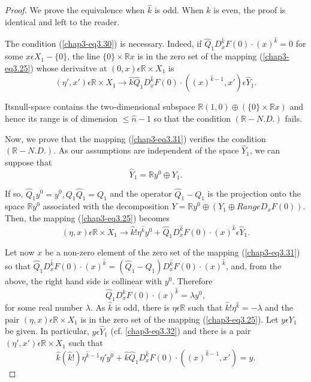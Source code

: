 \begin{proof}
We prove the equivalence when $\hat{k}$ is odd. When $\hat{k}$ is
even, the proof is identical and left to the reader.

The condition (\ref{chap3-eq3.30}) is necessary. Indeed, if
$\hat{Q}_{1}D_{x}^{\hat{k}}F(0) \cdot (x)^{\hat{k}} = 0$ for some $x
\epsilon X_{1} - \{0\}$, the line $\{0\} \times \mathbb{R}x$ is in the
zero set of the mapping (\ref{chap3-eq3.25}) whose derivaitve at $(0,
x) \epsilon \mathbb{R} \times X_{1}$ is
$$
(\eta' , x') \epsilon \mathbb{R} \times X_{1} \to
\hat{k}\hat{Q}_{1}D_{x}^{\hat{k}}F(0) \cdot ((x)^{\hat{k}-1}, x')
\epsilon \hat{Y}_{1}.
$$

Its\pageoriginale null-space contains the two-dimensional subspace
$\mathbb{R} (1, 0) \oplus (\{0\} \times \mathbb{R}x)$ and hence its
range is of dimension $\leq \hat{n} - 1$ so that the condition
$(\mathbb{R}-N.D.)$ fails.

Now, we prove that the mapping (\ref{chap3-eq3.31}) verifies the
condition $(\mathbb{R}-N.D.)$. As our assumptions are independent of
the space $\hat{Y}_{1}$, we can suppose that
\begin{equation*}
\hat{Y}_{1} = \mathbb{R} y^{0} \oplus Y_{1}.\tag{3.32}\label{chap3-eq3.32}
\end{equation*}

If so, $\hat{Q}_{1} y^{0} = y^{0}, Q_{1}\hat{Q}_{1} = Q_{1}$ and the
operator $\hat{Q}_{1} - Q_{1}$ is the projection onto the space
$\mathbb{R} y^{0}$ associated with the decomposition $Y = \mathbb{R}
y^{0} \oplus (Y_{1} \oplus Range D_{x}F(0))$. Then, the mapping
(\ref{chap3-eq3.25}) becomes 
$$
(\eta, x) \epsilon \mathbb{R} \times X_{1} \to \hat{k}! \eta^{\hat{k}}
y^{0} + \hat{Q}_{1}D_{x}^{\hat{k}}F(0) \cdot (x)^{\hat{k}} \epsilon \hat{Y}_{1}.
$$

Let now $x$ be a non-zero element of the zero set of the mapping
(\ref{chap3-eq3.31}) so that $\hat{Q}_{1}D_{x}^{\hat{k}}F(0) \cdot
(x)^{\hat{k}} = (\hat{Q}_{1} - Q_{1}) D_{x}^{\hat{k}}F(0) \cdot
(x)^{\hat{k}}$, and, from the above, the right hand side is collinear
with $y^{0}$. Therefore
$$
\hat{Q}_{1}D_{x}^{\hat{k}}F(0) \cdot (x)^{\hat{k}} = \lambda y^{0},
$$
for some real number $\lambda$. As $\hat{k}$ is odd, there is $\eta
\epsilon \mathbb{R}$ such that $\hat{k}! \eta^{\hat{k}} = -\lambda$
and the pair $(\eta, x) \epsilon \mathbb{R} \times X_{1}$ is in the
zero set of the mapping (\ref{chap3-eq3.25}). Let $y \epsilon Y_{1}$
be given. In particular, $y \epsilon \hat{Y}_{1}$
(cf. \ref{chap3-eq3.32}) and there is a pair $(\eta', x') \epsilon
\mathbb{R} \times X_{1}$ such that
$$
\hat{k} (\hat{k}!) \eta^{\hat{k} - 1} \eta' y^{0} + 
\hat{k}\hat{Q}_{1}D_{x}^{\hat{k}}F(0) \cdot ((x)^{\hat{k} - 1}, x') = y.
$$


\end{proof}
